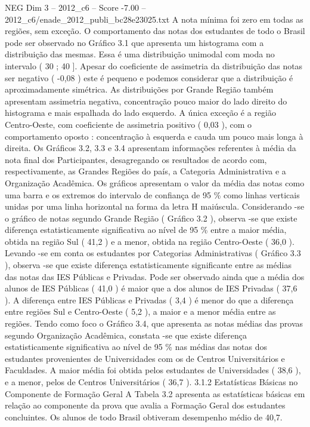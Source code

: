 \begin{textsample}{NEG Dim 3 – 2012\_c6 – Score -7.00 – 2012\_c6/enade\_2012\_publi\_bc28e23025.txt}
A nota mínima foi zero em todas as regiões, sem exceção.
O comportamento das notas dos estudantes de todo o Brasil pode ser observado no Gráfico 3.1 que apresenta um histograma com a distribuição das mesmas.
Essa é uma distribuição unimodal com moda no intervalo ( 30 ; 40 ].
Apesar do coeficiente de assimetria da distribuição das notas ser negativo ( -0,08 ) este é pequeno e podemos considerar que a distribuição é aproximadamente simétrica.
As distribuições por Grande Região também apresentam assimetria negativa, concentração pouco maior do lado direito do histograma e mais espalhada do lado esquerdo.
A única exceção é a região Centro-Oeste, com coeficiente de assimetria positivo ( 0,03 ), com o comportamento oposto : concentração à esquerda e cauda um pouco mais longa à direita.
Os Gráficos 3.2, 3.3 e 3.4 apresentam informações referentes à média da nota final dos Participantes, desagregando os resultados de acordo com, respectivamente, as Grandes Regiões do país, a Categoria Administrativa e a Organização Acadêmica.
Os gráficos apresentam o valor da média das notas como uma barra e os extremos do intervalo de confiança de 95 \% como linhas verticais unidas por uma linha horizontal na forma da letra H maiúscula.
Considerando -se o gráfico de notas segundo Grande Região ( Gráfico 3.2 ), observa -se que existe diferença estatisticamente significativa ao nível de 95 \% entre a maior média, obtida na região Sul ( 41,2 ) e a menor, obtida na região Centro-Oeste ( 36,0 ).
Levando -se em conta os estudantes por Categorias Administrativas ( Gráfico 3.3 ), observa -se que existe diferença estatisticamente significante entre as médias das notas das IES Públicas e Privadas.
Pode ser observado ainda que a média dos alunos de IES Públicas ( 41,0 ) é maior que a dos alunos de IES Privadas ( 37,6 ).
A diferença entre IES Públicas e Privadas ( 3,4 ) é menor do que a diferença entre regiões Sul e Centro-Oeste ( 5,2 ), a maior e a menor média entre as regiões.
Tendo como foco o Gráfico 3.4, que apresenta as notas médias das provas segundo Organização Acadêmica, constata -se que existe diferença estatisticamente significativa ao nível de 95 \% nas médias das notas dos estudantes provenientes de Universidades com os de Centros Universitários e Faculdades.
A maior média foi obtida pelos estudantes de Universidades ( 38,6 ), e a menor, pelos de Centros Universitários ( 36,7 ). 3.1.2 Estatísticas Básicas no Componente de Formação Geral A Tabela 3.2 apresenta as estatísticas básicas em relação ao componente da prova que avalia a Formação Geral dos estudantes concluintes.
Os alunos de todo Brasil obtiveram desempenho médio de 40,7.

\end{textsample}
